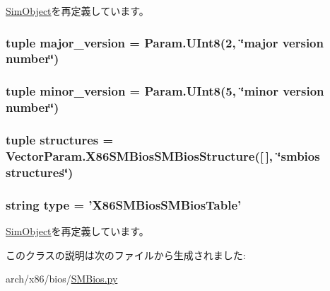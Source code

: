 \hyperlink{classm5_1_1SimObject_1_1SimObject_a17da7064bc5c518791f0c891eff05fda}{SimObject}を再定義しています。\hypertarget{classSMBios_1_1X86SMBiosSMBiosTable_ac557741270717fefb4c17ddc82079890}{
\subsubsection[{major\_\-version}]{\setlength{\rightskip}{0pt plus 5cm}tuple {\bf major\_\-version} = Param.UInt8(2, \char`\"{}major version number\char`\"{})}}
\label{classSMBios_1_1X86SMBiosSMBiosTable_ac557741270717fefb4c17ddc82079890}
\hypertarget{classSMBios_1_1X86SMBiosSMBiosTable_a0c85aae24f1a132c061845c52511f5a5}{
\subsubsection[{minor\_\-version}]{\setlength{\rightskip}{0pt plus 5cm}tuple {\bf minor\_\-version} = Param.UInt8(5, \char`\"{}minor version number\char`\"{})}}
\label{classSMBios_1_1X86SMBiosSMBiosTable_a0c85aae24f1a132c061845c52511f5a5}
\hypertarget{classSMBios_1_1X86SMBiosSMBiosTable_a4912bbdac7af98091fd2e9c683e0f7d3}{
\subsubsection[{structures}]{\setlength{\rightskip}{0pt plus 5cm}tuple {\bf structures} = VectorParam.X86SMBiosSMBiosStructure(\mbox{[}$\,$\mbox{]}, \char`\"{}smbios {\bf structures}\char`\"{})}}
\label{classSMBios_1_1X86SMBiosSMBiosTable_a4912bbdac7af98091fd2e9c683e0f7d3}
\hypertarget{classSMBios_1_1X86SMBiosSMBiosTable_acce15679d830831b0bbe8ebc2a60b2ca}{
\subsubsection[{type}]{\setlength{\rightskip}{0pt plus 5cm}string {\bf type} = '{\bf X86SMBiosSMBiosTable}'}}
\label{classSMBios_1_1X86SMBiosSMBiosTable_acce15679d830831b0bbe8ebc2a60b2ca}


\hyperlink{classm5_1_1SimObject_1_1SimObject_acce15679d830831b0bbe8ebc2a60b2ca}{SimObject}を再定義しています。

このクラスの説明は次のファイルから生成されました:\begin{DoxyCompactItemize}
\item 
arch/x86/bios/\hyperlink{SMBios_8py}{SMBios.py}\end{DoxyCompactItemize}

